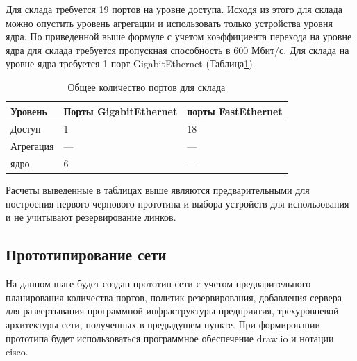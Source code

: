 Для склада требуется 19 портов на уровне доступа. Исходя из этого для склада можно опустить уровень агрегации и использовать только устройства уровня ядра. По приведенной выше формуле с учетом коэффициента перехода на уровне ядра для склада требуется пропускная способность в 600 Мбит/с. Для склада на уровне ядра требуется 1 порт GigabitEthernet (Таблица\;\ref{table:all_ports_sk}).

\begin{table}[H]
    \centering
    \caption{Общее количество портов для склада\label{table:all_ports_sk}}
    \small
    \begin{tabularx}{\textwidth}{|X|X|X|}
        \hline
		Уровень		& Порты GigabitEthernet	&	порты FastEthernet	\\
        \hline	
		Доступ		& 1       				&  	18					\\
		\hline
		Агрегация	& ---					& 	---					\\
		\hline
		ядро		& 6         			&  	---					\\
        \hline
    \end{tabularx}
\end{table}


Расчеты выведенные в таблицах выше являются предварительными для построения первого чернового прототипа и выбора устройств для использования и не учитывают резервирование линков.

\subsection{Прототипирование сети}
На данном шаге будет создан прототип сети с учетом предварительного планирования количества портов, политик резервирования, добавления сервера для развертывания программной инфраструктуры предприятия, трехуровневой архитектуры сети, полученных в предыдущем пункте. При формировании прототипа будет использоваться программное обеспечение draw.io и нотации cisco. 


